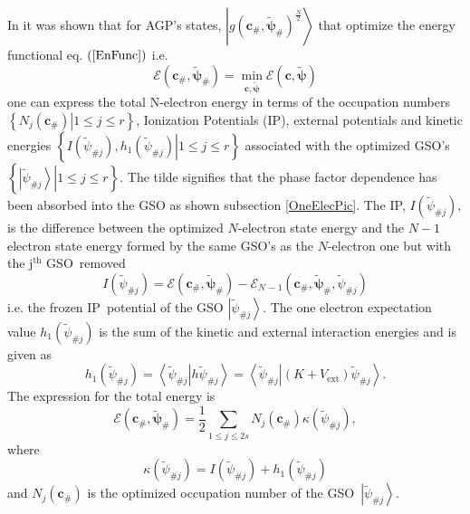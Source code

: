 \documentclass[aps,preprint]{revtex4}%
\begin{document}
In \cite{OrtizWeiner2006} it was shown that for AGP's states, $\left\vert
g\left(  \bm{c}_{\#},\bm{\tilde{\psi}}_{\#}\right)  ^{\frac{N}{2}%
}\right\rangle $ that optimize the energy functional eq. $\left(
\ref{EnFunc}\right)  $ i.e.
\begin{equation}
\mathcal{E}\left(  \bm{c}_{\#},\bm{\tilde{\psi}}_{\#}\right)  =\min
_{\bm{c},\bm{\tilde{\psi}}}\mathcal{E}\left(  \bm{c},\bm{\tilde{\psi}}\right)
\end{equation}
one can express the total N-electron energy in terms of the occupation numbers
$\left\{  \left.  N_{j}\left(  \bm{c}_{\#}\right)  \right\vert 1\leq j\leq
r\right\}  $, Ionization Potentials (IP), external potentials and kinetic
energies $\left\{  \left.  I\left(  \tilde{\psi}_{\#j}\right)  ,h_{1}\left(
\tilde{\psi}_{\#j}\right)  \right\vert 1\leq j\leq r\right\}  $ associated
with the optimized GSO's $\left\{  \left.  \left\vert \tilde{\psi}%
_{\#j}\right\rangle \right\vert 1\leq j\leq r\right\}  $. The tilde signifies
that the phase factor dependence has been absorbed into the GSO as shown
subsection \ref{OneElecPic}. The IP, $I\left(  \tilde{\psi}_{\#j}\right)  ,$
is the difference between the optimized $N$-electron state energy and the
$N-1$ electron state energy formed by the same GSO's as the $N$-electron one
but with the j$^{\text{th}}$ GSO\ removed
\begin{equation}
I\left(  \tilde{\psi}_{\#j}\right)  =\mathcal{E}\left(  \bm{c}_{\#}%
,\bm{\tilde{\psi}}_{\#}\right)  -\mathcal{E}_{N\,-1}\left(  \bm{c}_{\#}%
,\bm{\tilde{\psi}}_{\#}\bm{,}\tilde{\psi}_{\#j}\right)
\end{equation}
i.e. the frozen IP\ potential of the GSO $\left\vert \tilde{\psi}%
_{\#j}\right\rangle $. The one electron expectation value $h_{1}\left(
\tilde{\psi}_{\#j}\right)  $ is the sum of the kinetic and external
interaction energies and is given as
\begin{equation}
h_{1}\left(  \tilde{\psi}_{\#j}\right)  =\left\langle \left.  \tilde{\psi
}_{\#j}\right\vert h\tilde{\psi}_{\#j}\right\rangle =\left\langle \left.
\tilde{\psi}_{\#j}\right\vert \left(  K+V_{\text{ext}}\right)  \tilde{\psi
}_{\#j}\right\rangle .
\end{equation}
The expression for the total energy is
\begin{equation}
\mathcal{E}\left(  \bm{c}_{\#},\bm{\tilde{\psi}}_{\#}\right)  =\frac{1}{2}%
\sum_{1\leq j\leq2s}N_{j}\left(  \bm{c}_{\#}\right)  \kappa\left(  \tilde
{\psi}_{\#j}\right)  ,
\end{equation}
where
\begin{equation}
\kappa\left(  \tilde{\psi}_{\#j}\right)  =I\left(  \tilde{\psi}_{\#j}\right)
+h_{1}\left(  \tilde{\psi}_{\#j}\right)
\end{equation}
and $N_{j}\left(  \bm{c}_{\#}\right)  $ is the optimized occupation number of
the GSO\ $\left\vert \tilde{\psi}_{\#j}\right\rangle .$
\end{document}

